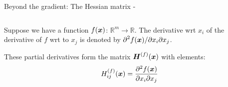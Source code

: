 \begin{frame}[t,allowframebreaks]{
    Beyond the gradient: The Hessian matrix -}
\begin{columns}
\begin{column}{0.58\textwidth}
        \end{column}
    \end{columns}

    \framebreak

   
    Suppose we have a function 
    $f(\boldsymbol{x})$: $\mathbb{R}^m \rightarrow \mathbb{R}$.
    The derivative wrt $x_i$ of the derivative of $f$ wrt to $x_j$ 
    is denoted by $\displaystyle \partial^2 f(\boldsymbol{x}) / \partial x_i \partial x_j$.\\        
    \vspace{0.1cm}

    These partial derivatives form the matrix 
    $\boldsymbol{H}^{(f)}(\boldsymbol{x})$ with elements:
    \begin{equation}
        H^{(f)}_{ij}(\boldsymbol{x}) = 
        \frac{\partial^2 f(\boldsymbol{x})}{\partial x_i \partial x_j}
        \label{eq:hessian_1}
    \end{equation}\\
    

\end{frame}
